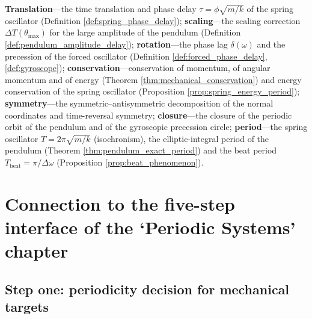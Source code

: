 \begin{remark}\label{rem:mech_seven_themes}
\textbf{Translation}---the time translation and phase delay $\tau = \phi\sqrt{m/k}$ of the spring oscillator (Definition \ref{def:spring_phase_delay}); \textbf{scaling}---the scaling correction $\Delta T(\theta_{\max})$ for the large amplitude of the pendulum (Definition \ref{def:pendulum_amplitude_delay}); \textbf{rotation}---the phase lag $\delta(\omega)$ and the precession of the forced oscillator (Definition \ref{def:forced_phase_delay}, \ref{def:gyroscope}); \textbf{conservation}---conservation of momentum, of angular momentum and of energy (Theorem \ref{thm:mechanical_conservation}) and energy conservation of the spring oscillator (Proposition \ref{prop:spring_energy_period}); \textbf{symmetry}---the symmetric--antisymmetric decomposition of the normal coordinates and time-reversal symmetry; \textbf{closure}---the closure of the periodic orbit of the pendulum and of the gyroscopic precession circle; \textbf{period}---the spring oscillator $T = 2\pi\sqrt{m/k}$ (isochronism), the elliptic-integral period of the pendulum (Theorem \ref{thm:pendulum_exact_period}) and the beat period $T_{\text{beat}} = \pi/\Delta\omega$ (Proposition \ref{prop:beat_phenomenon}).
\end{remark}

\section{Connection to the five-step interface of the `Periodic Systems' chapter}
\label{sec:mech_five_steps}

\subsection{Step one: periodicity decision for mechanical targets}

